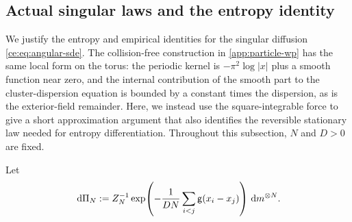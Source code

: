 \documentclass[11pt,reqno]{amsart}
\numberwithin{equation}{section}
\theoremstyle{plain}
\theoremstyle{remark}
\begin{document}
\subsection{Actual singular laws and the entropy identity}\label{ce:sec:singular}

We justify the entropy and empirical identities for the singular diffusion \eqref{ce:eq:angular-sde}. The collision-free construction in \cref{app:particle-wp} has the same local form on the torus: the periodic kernel is $-\pi^2\log|x|$ plus a smooth function near zero, and the internal contribution of the smooth part to the cluster-dispersion equation is bounded by a constant times the dispersion, as is the exterior-field remainder. Here, we instead use the square-integrable force to give a short approximation argument that also identifies the reversible stationary law needed for entropy differentiation. Throughout this subsection, $N$ and $D>0$ are fixed.

Let
\begin{equation}\label{ce:eq:stationary}
 \,\mathrm d\Pi_N:=Z_N^{-1}\exp\!\left(-\frac1{DN}\sum_{i<j}\mathsf g(x_i-x_j)\right)\,\mathrm d m^{\otimes N}.
\end{equation}
\end{document}
